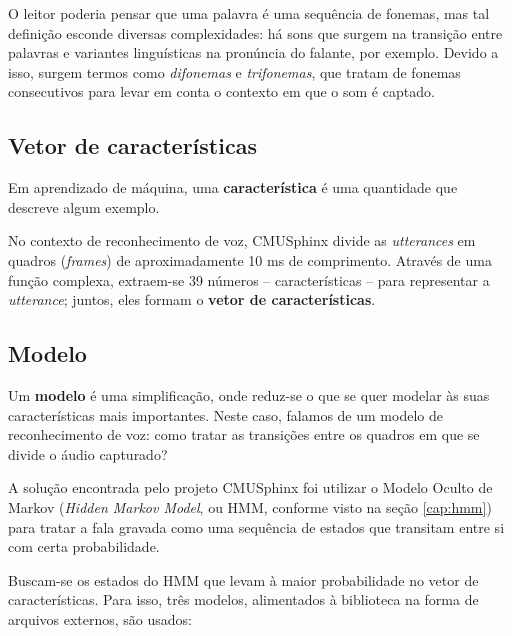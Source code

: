 O leitor poderia pensar que uma palavra é uma sequência de fonemas, mas tal definição esconde diversas complexidades: há sons que surgem na transição entre palavras e variantes linguísticas na pronúncia do falante, por exemplo. Devido a isso, surgem termos como \textit{difonemas} e \textit{trifonemas}, que tratam de fonemas consecutivos para levar em conta o contexto em que o som é captado.


\subsection{Vetor de características}

Em aprendizado de máquina, uma \textbf{característica} é uma quantidade que descreve algum exemplo.

No contexto de reconhecimento de voz, CMUSphinx divide as \textit{utterances} em quadros (\textit{frames}) de aproximadamente 10 ms de comprimento. Através de uma função complexa, extraem-se 39 números -- características -- para representar a \textit{utterance}; juntos, eles formam o \textbf{vetor de características}.


\subsection{Modelo}

Um \textbf{modelo} é uma simplificação, onde reduz-se o que se quer modelar às suas características mais importantes. Neste caso, falamos de um modelo de reconhecimento de voz: como tratar as transições entre os quadros em que se divide o áudio capturado?

A solução encontrada pelo projeto CMUSphinx foi utilizar o Modelo Oculto de Markov (\textit{Hidden Markov Model}, ou HMM, conforme visto na seção \ref{cap:hmm}) para tratar a fala gravada como uma sequência de estados que transitam entre si com certa probabilidade.

Buscam-se os estados do HMM que levam à maior probabilidade no vetor de características. Para isso, três modelos, alimentados à biblioteca na forma de arquivos externos, são usados:

